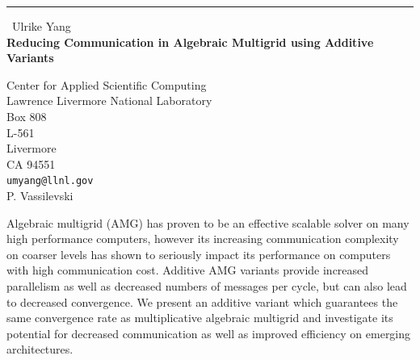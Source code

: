 \documentclass{report}
\begin{document}
\begin{center}
\rule{6in}{1pt} \
{\large Ulrike Yang \\
{\bf Reducing Communication in Algebraic Multigrid using Additive Variants}}

Center for Applied Scientific Computing \\ Lawrence Livermore National Laboratory \\ Box 808 \\ L-561 \\ Livermore \\ CA 94551
\\
{\tt umyang@llnl.gov}\\
P. Vassilevski\end{center}

Algebraic multigrid (AMG) has proven to be an effective scalable solver
on many high performance computers, however its increasing communication
complexity on coarser levels has shown to seriously impact its
performance on computers with high communication cost. Additive AMG
variants provide increased parallelism as well as decreased numbers of
messages per cycle, but can also lead to decreased convergence. We
present an additive variant which guarantees the same convergence rate as
multiplicative algebraic multigrid and investigate its potential for
decreased communication as well as improved efficiency on emerging
architectures.
\end{document}
